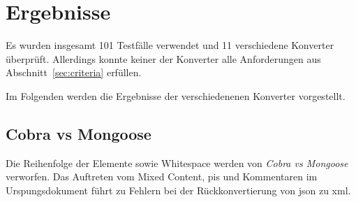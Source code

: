 \chapter{Ergebnisse} \label{chap:results}

\begin{figure}[b!]
    
    \label{tbl:results-basic}
\end{figure}

\begin{figure}[t!]
    
    \label{tbl:results-chars}
\end{figure}

\begin{figure}[t!]
    
    \label{tbl:results-complex}
\end{figure}

\begin{figure}[t!]
    
    \label{tbl:results-sec}
\end{figure}

Es wurden insgesamt 101 Testfälle verwendet und 11 verschiedene Konverter überprüft. Allerdings konnte keiner der Konverter alle Anforderungen aus Abschnitt~\ref{sec:criteria} erfüllen.

Im Folgenden werden die Ergebnisse der verschiedenenen Konverter vorgestellt.


\section{Cobra vs Mongoose}
\label{sec:cobravsmongoose}

Die Reihenfolge der Elemente sowie Whitespace werden von \emph{Cobra vs Mongoose} verworfen. Das Auftreten vom Mixed Content, \glspl{pi} und Kommentaren im Urspungsdokument führt zu Fehlern bei der Rückkonvertierung von \acrshort{json} zu \acrshort{xml}.

